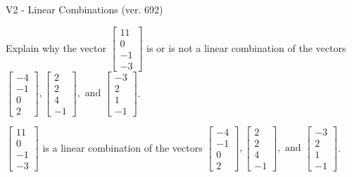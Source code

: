 \begin{exercise}
  \begin{exerciseTitle}V2 - Linear Combinations (ver. 692)\end{exerciseTitle}
  \begin{exerciseStatement}
    Explain why the vector \(\left[\begin{array}{c}
11 \\
0 \\
-1 \\
-3
\end{array}\right]\)  is or is not a linear 
	combination of the vectors \(\left[\begin{array}{c}
-4 \\
-1 \\
0 \\
2
\end{array}\right] , \left[\begin{array}{c}
2 \\
2 \\
4 \\
-1
\end{array}\right] , \text{ and } \left[\begin{array}{c}
-3 \\
2 \\
1 \\
-1
\end{array}\right]\).
	


  \end{exerciseStatement}
  \begin{exerciseAnswer}
   \(\left[\begin{array}{c}
11 \\
0 \\
-1 \\
-3
\end{array}\right]\) 
  	 is  
	a linear combination of the vectors \(\left[\begin{array}{c}
-4 \\
-1 \\
0 \\
2
\end{array}\right] , \left[\begin{array}{c}
2 \\
2 \\
4 \\
-1
\end{array}\right] , \text{ and } \left[\begin{array}{c}
-3 \\
2 \\
1 \\
-1
\end{array}\right]\).

	
  


  \end{exerciseAnswer}
\end{exercise}